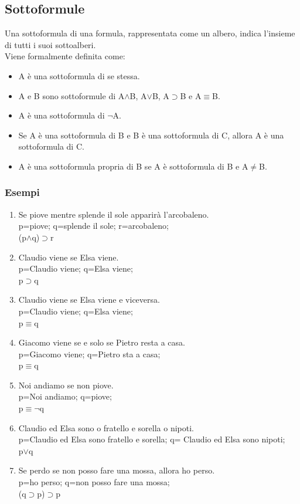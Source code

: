 \documentclass[../main.tex]{subfiles}
\begin{document}
    \subsection{Sottoformule}
    Una sottoformula di una formula, rappresentata come un albero, indica l'insieme di tutti i suoi sottoalberi.\\
    Viene formalmente definita come:
    \begin{itemize}
        \item A è una sottoformula di se stessa.
        \item A e B sono sottoformule di A$\land$B, A$\lor$B, A$\supset$B e A$\equiv$B.
        \item A è una sottoformula di $\lnot$A.
        \item Se A è una sottoformula di B e B è una sottoformula di C, allora A è una sottoformula di C.
        \item A è una sottoformula propria di B se A è sottoformula di B e A$\neq$B.
    \end{itemize}

    \subsubsection{Esempi}
    \begin{enumerate}
        \item Se piove mentre splende il sole apparirà l'arcobaleno.\\
            p=piove; q=splende il sole; r=arcobaleno;\\
            (p$\land$q)$\supset$r
        \item Claudio viene se Elsa viene.\\
            p=Claudio viene; q=Elsa viene;\\
            p$\supset$q
        \item Claudio viene se Elsa viene e viceversa.\\
            p=Claudio viene; q=Elsa viene;\\
            p$\equiv$q
        \item Giacomo viene se e solo se Pietro resta a casa.\\
            p=Giacomo viene; q=Pietro sta a casa;\\
            p$\equiv$q
        \item Noi andiamo se non piove.\\
            p=Noi andiamo; q=piove;\\
            p$\equiv \lnot$q
        \item Claudio ed Elsa sono o fratello e sorella o nipoti.\\
            p=Claudio ed Elsa sono fratello e sorella; q= Claudio ed Elsa sono nipoti;\\
            p$\lor$q
        \item Se perdo se non posso fare una mossa, allora ho perso.\\
            p=ho perso; q=non posso fare una mossa;\\
            (q$\supset$p)$\supset$p
    \end{enumerate}
\end{document}

